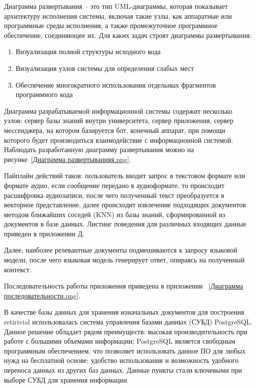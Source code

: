 

Диаграмма развертывания – это тип UML-диаграммы, которая показывает архитектуру
исполнения системы, включая такие узлы, как аппаратные или программные среды
исполнения, а также промежуточное программное обеспечение, соединяющее их. 
Для каких задач строят диаграммы развертывания:

\begin{enumerate}
    \item Визуализация полной структуры исходного кода
    \item Визуализация узлов системы для определения слабых мест
    \item Обеспечение многократного использования отдельных фрагментов
        программного кода
\end{enumerate}

Диаграмма разрабатываемой информационной системы содержит несколько узлов: 
сервер базы знаний внутри университета, сервер приложения, сервер мессенджера,
на котором базируется бот, конечный аппарат, при помощи которого будет 
производиться взаимодействие с информационной системой. Наблюдать разработанную
диаграмму развертывания можно на рисунке~\ref{Диаграмма развертыванияя.png}.




Пайплайн действий таков: пользователь вводит запрос в текстовом формате или 
формате аудио, если сообщение передано в аудиоформате, то происходит 
расшифровка аудиозаписи, после чего полученный текст преобразуется в векторное
представление, далее происходит извлечение подходящих документов методом
ближайших соседей (KNN) из базы знаний, сформированной из документов в базе 
данных. Листинг поведения для различных входящих данные приведен в приложении Д.

Далее, наиболее релевантные документы подмешиваются к запросу языковой модели,
после чего языковая модель генерирует ответ, опираясь на полученный контекст.

Последовательность работы приложения приведена в приложении
~\ref{Диаграмма последовательности.png}.


В качестве базы данных для хранения изначальных документов для построения 
retirivial использовалась система управления базами данных (СУБД) PostgreSQL\@.
Данное решение обладает рядом преимуществ: высокая производительность при 
работе с большими объемами информации; PostgreSQL является свободным 
программным обеспечением, что позволяет использовать данное ПО для любых 
нужд на бесплатной основе; удобство использования и возможность удобного 
переноса данных из других баз данных. Данные пункты стали ключевыми при выборе 
СУБД для хранения информации. 


